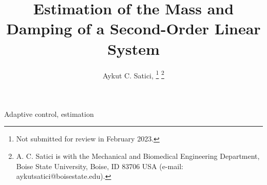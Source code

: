 \documentclass[journal,twoside,web]{ieeecolor}
\begin{document}
\title{Estimation of the Mass and Damping of a Second-Order Linear System} 
\author{
    Aykut C. Satici, 
    \thanks{Not submitted for review in February 2023.}
    \thanks{A. C. Satici is with the Mechanical and Biomedical Engineering Department, Boise State University, Boise, ID 83706 USA
    (e-mail: aykutsatici@boisestate.edu).}
}
\maketitle

  

\begin{IEEEkeywords}
    Adaptive control, estimation
\end{IEEEkeywords}






        
  
\end{document}
